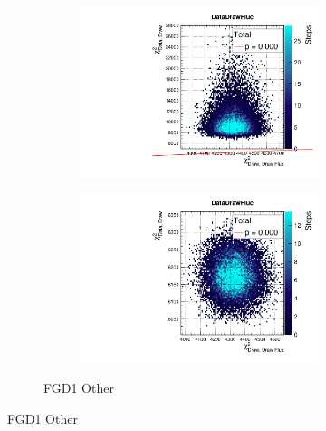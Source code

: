 \begin{figure}[h]
\begin{subfigure}[t]{\textwidth}
\begin{subfigure}[t]{0.24\textwidth}
		\end{subfigure}
		\begin{subfigure}[t]{0.24\textwidth}
			\includegraphics[width=\textwidth, trim={0mm 0mm 0mm 8mm}, clip,page=83]{figures/mach3/2018/data/2018a_FixedCov_RedCov_Mpi_Data_merge_PriorPred_procs}
		\end{subfigure}
		\begin{subfigure}[t]{0.24\textwidth}
			\includegraphics[width=\textwidth, trim={0mm 0mm 0mm 8mm}, clip,page=83]{figures/mach3/2018/data/2018a_FixedCov_RedCov_Mpi_Data_merge_PostPredStore_FullLLH_procs}
		\end{subfigure}
		\caption{FGD1 \numubar Other}
	\end{subfigure}
	

\end{figure}
